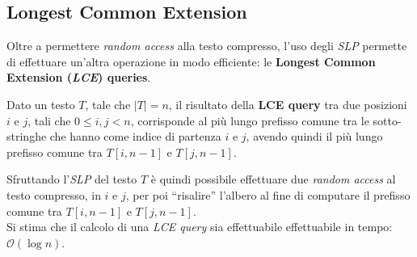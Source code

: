 \subsection{Longest Common Extension}
Oltre a permettere \textit{random access} alla testo compresso, 
l'uso degli \textit{SLP} permette di effettuare 
un'altra operazione in modo efficiente: le \textbf{Longest Common Extension
  (\textit{LCE}) queries}.
\begin{definizione}
  Dato un testo $T$, tale che $|T|=n$, il risultato della \textbf{LCE query} tra
  due posizioni $i$ e $j$, tali che $0\leq i,j<n$, corrisponde al più lungo
  prefisso comune tra le sotto-stringhe che hanno come indice di partenza $i$ e
  $j$, avendo quindi il più lungo prefisso comune tra $T[i,n-1]$ e $T[j,n-1]$.
\end{definizione}
Sfruttando l'\textit{SLP} del testo $T$ è quindi possibile effettuare due
\textit{random access} al testo compresso, in $i$ e $j$, per poi ``risalire''
l'albero al fine di computare il prefisso comune tra $T[i,n-1]$ e
$T[j,n-1]$.\\
Si stima che il calcolo di una \textit{LCE query} sia effettuabile
effettuabile in tempo: $\mathcal{O}\left(\log n\right)$.

